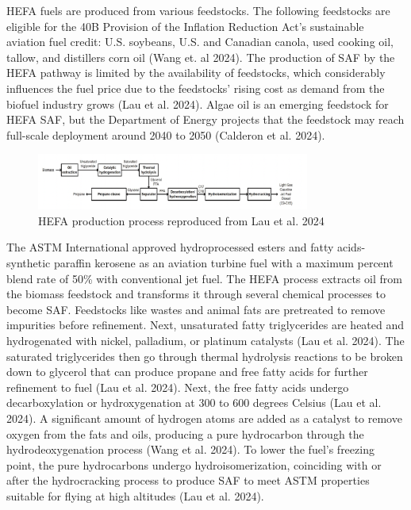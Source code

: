 \documentclass[12pt]{article}
\begin{document}
HEFA fuels are produced from various feedstocks. The following feedstocks are eligible for the 40B Provision of the Inflation Reduction Act’s sustainable aviation fuel credit: U.S. soybeans, U.S. and Canadian canola, used cooking oil, tallow, and distillers corn oil (Wang et. al 2024). The production of SAF by the HEFA pathway is limited by the availability of feedstocks, which considerably influences the fuel price due to the feedstocks' rising cost as demand from the biofuel industry grows (Lau et al. 2024). Algae oil is an emerging feedstock for HEFA SAF, but the Department of Energy projects that the feedstock may reach full-scale deployment around 2040 to 2050 (Calderon et al. 2024). 


\begin{figure}[H]
\centering
\includegraphics[width=0.8\textwidth]{Figures/Fig 4.png} %
\caption{HEFA production process reproduced from Lau et al. 2024}
\label{figure 4}
\end{figure}

The ASTM International approved hydroprocessed esters and fatty acids-synthetic paraffin kerosene as an aviation turbine fuel with a maximum percent blend rate of 50\% with conventional jet fuel. The HEFA process extracts oil from the biomass feedstock and transforms it through several chemical processes to become SAF. Feedstocks like wastes and animal fats are pretreated to remove impurities before refinement. Next, unsaturated fatty triglycerides are heated and hydrogenated with nickel, palladium, or platinum catalysts (Lau et al. 2024). The saturated triglycerides then go through thermal hydrolysis reactions to be broken down to glycerol that can produce propane and free fatty acids for further refinement to fuel (Lau et al. 2024). Next, the free fatty acids undergo decarboxylation or hydroxygenation at 300 to 600 degrees Celsius (Lau et al. 2024). A significant amount of hydrogen atoms are added as a catalyst to remove oxygen from the fats and oils, producing a pure hydrocarbon through the hydrodeoxygenation process (Wang et al. 2024). To lower the fuel’s freezing point, the pure hydrocarbons undergo hydroisomerization, coinciding with or after the hydrocracking process to produce SAF to meet ASTM properties suitable for flying at high altitudes (Lau et al. 2024). 
\end{document}
